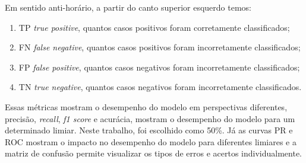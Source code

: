 Em sentido anti-horário, a partir do canto superior esquerdo temos: 

\begin{enumerate}
\item {TP} \textit{true positive}, quantos casos positivos foram corretamente classificados;
\item {FN} \textit{false negative}, quantos casos positivos foram incorretamente classificados;
\item {FP} \textit{false positive}, quantos casos negativos foram incorretamente classificados;
\item {TN} \textit{true negative}, quantos casos negativos foram incorretamente classificados.
\end{enumerate}

Essas métricas mostram o desempenho do modelo em perspectivas diferentes, 
precisão, \textit{recall}, \textit{f1 score} e acurácia, mostram o desempenho do modelo para um determinado limiar. Neste trabalho, foi escolhido como 50\%. 
Já as curvas PR e ROC mostram o impacto no desempenho do modelo para diferentes limiares e a matriz de confusão permite visualizar os tipos de erros e acertos
individualmente. 
